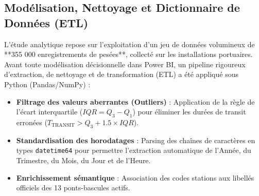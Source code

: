 \documentclass[12pt,a4paper,oneside]{report}
\begin{document}
\subsection{Modélisation, Nettoyage et Dictionnaire de Données (ETL)}
L'étude analytique repose sur l'exploitation d'un jeu de données volumineux de **355 000 enregistrements de pesées**, collecté sur les installations portuaires. Avant toute modélisation décisionnelle dans Power BI, un pipeline rigoureux d'extraction, de nettoyage et de transformation (ETL) a été appliqué sous Python (Pandas/NumPy) :
\begin{itemize}
    \item \textbf{Filtrage des valeurs aberrantes (Outliers)} : Application de la règle de l'écart interquartile ($IQR = Q_3 - Q_1$) pour éliminer les durées de transit erronées ($T_{\text{TRANSIT}} > Q_3 + 1.5 \times IQR$).
    \item \textbf{Standardisation des horodatages} : Parsing des chaînes de caractères en types \texttt{datetime64} pour permettre l'extraction automatique de l'Année, du Trimestre, du Mois, du Jour et de l'Heure.
    \item \textbf{Enrichissement sémantique} : Association des codes stations aux libellés officiels des 13 ponts-bascules actifs.
\end{itemize}
\end{document}
